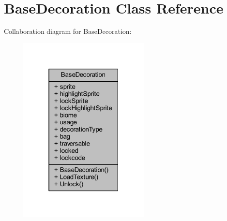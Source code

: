 \hypertarget{class_base_decoration}{}\section{Base\+Decoration Class Reference}
\label{class_base_decoration}


Collaboration diagram for Base\+Decoration\+:\nopagebreak
\begin{figure}[H]
\begin{center}
\leavevmode
\includegraphics[width=187pt]{class_base_decoration__coll__graph}
\end{center}
\end{figure}
